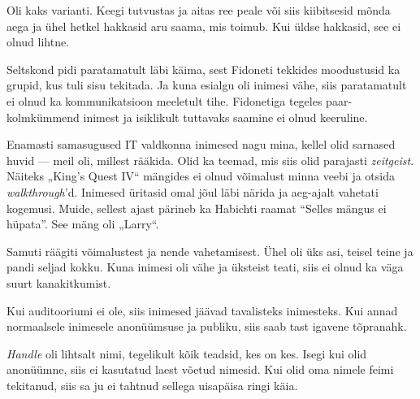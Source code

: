 
Oli kaks varianti. Keegi tutvustas ja aitas ree peale või siis kiibitsesid mõnda 
aega ja ühel hetkel hakkasid aru saama, mis toimub. Kui üldse hakkasid, see ei olnud lihtne.


Seltskond pidi paratamatult läbi käima, sest Fidoneti tekkides moodustusid ka grupid, kus tuli sisu 
tekitada. Ja kuna esialgu oli inimesi vähe, siis paratamatult ei olnud ka
kommunikatsioon meeletult tihe. Fidonetiga tegeles 
paar-kolmkümmend inimest ja isiklikult tuttavaks saamine ei olnud keeruline.


Enamasti samasugused IT valdkonna inimesed nagu mina, kellel olid
sarnased huvid --- meil oli, millest rääkida. Olid ka 
teemad, mis siis olid parajasti \emph{zeitgeist}. 
Näiteks „King's Quest 
IV“ mängides ei olnud võimalust minna 
veebi ja otsida \emph{walkthrough}'d. Inimesed üritasid omal jõul 
läbi närida ja aeg-ajalt vahetati kogemusi. Muide, sellest ajast pärineb 
ka Habichti raamat \enquote{Selles mängus ei hüpata}. 
See mäng oli 
„Larry“.

Samuti räägiti võimalustest ja nende 
vahetamisest. Ühel oli üks asi, teisel teine ja pandi seljad kokku. Kuna 
inimesi oli vähe ja üksteist teati, siis ei olnud ka väga 
suurt kanakitkumist.


Kui auditooriumi ei ole, siis inimesed jäävad tavalisteks inimesteks. Kui 
annad normaalsele inimesele anonüümsuse ja publiku, siis saab tast igavene 
tõpranahk.


\emph{Handle} oli lihtsalt nimi, tegelikult kõik teadsid, kes on kes. 
Isegi kui olid anonüümne, siis ei 
kasutatud laest võetud nimesid. Kui olid oma nimele
feimi tekitanud, siis sa ju ei tahtnud sellega 
uisapäisa ringi käia.

